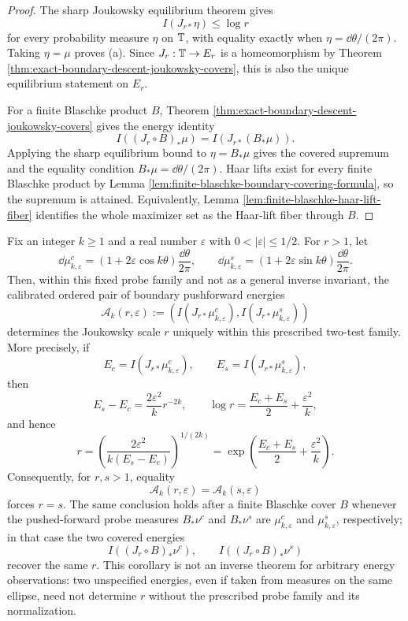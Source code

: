 \begin{proof}
The sharp Joukowsky equilibrium theorem gives
\[
I(J_{r\ast}\eta)\le\log r
\]
for every probability measure \(\eta\) on \(\mathbb{T}\), with equality exactly when \(\eta=\dd\theta/(2\pi)\).  Taking \(\eta=\mu\) proves \textup{(a)}.  Since \(J_r:\mathbb{T}\to E_r\) is a homeomorphism by Theorem \ref{thm:exact-boundary-descent-joukowsky-covers}, this is also the unique equilibrium statement on \(E_r\).

For a finite Blaschke product \(B\), Theorem \ref{thm:exact-boundary-descent-joukowsky-covers} gives the energy identity
\[
I((J_r\circ B)_\ast\mu)=I(J_{r\ast}(B_\ast\mu)).
\]
Applying the sharp equilibrium bound to \(\eta=B_\ast\mu\) gives the covered supremum and the equality condition \(B_\ast\mu=\dd\theta/(2\pi)\).  Haar lifts exist for every finite Blaschke product by Lemma \ref{lem:finite-blaschke-boundary-covering-formula}, so the supremum is attained.
Equivalently, Lemma \ref{lem:finite-blaschke-haar-lift-fiber} identifies the whole maximizer set as the Haar-lift fiber through \(B\).
\end{proof}

\begin{corollary}\label{cor:two-mode-joukowsky-scale-rigidity}
Fix an integer \(k\ge1\) and a real number \(\varepsilon\) with \(0<|\varepsilon|\le1/2\).  For \(r>1\), let
\[
\dd\mu^c_{k,\varepsilon}=(1+2\varepsilon\cos k\theta)\frac{\dd\theta}{2\pi},
\qquad
\dd\mu^s_{k,\varepsilon}=(1+2\varepsilon\sin k\theta)\frac{\dd\theta}{2\pi}.
\]
Then, within this fixed probe family and not as a general inverse invariant, the calibrated ordered pair of boundary pushforward energies
\[
\mathcal A_k(r,\varepsilon):=
\left(
I(J_{r\ast}\mu^c_{k,\varepsilon}),
I(J_{r\ast}\mu^s_{k,\varepsilon})
\right)
\]
determines the Joukowsky scale \(r\) uniquely within this prescribed two-test family.  More precisely, if
\[
E_c=I(J_{r\ast}\mu^c_{k,\varepsilon}),
\qquad
E_s=I(J_{r\ast}\mu^s_{k,\varepsilon}),
\]
then
\[
E_s-E_c=\frac{2\varepsilon^2}{k}r^{-2k},
\qquad
\log r=\frac{E_c+E_s}{2}+\frac{\varepsilon^2}{k},
\]
and hence
\[
\boxed{\;
r=\left(\frac{2\varepsilon^2}{k(E_s-E_c)}\right)^{1/(2k)}
=\exp\!\left(\frac{E_c+E_s}{2}+\frac{\varepsilon^2}{k}\right).
\;}
\]
Consequently, for \(r,s>1\), equality
\[
\mathcal A_k(r,\varepsilon)=\mathcal A_k(s,\varepsilon)
\]
forces \(r=s\).  The same conclusion holds after a finite Blaschke cover \(B\) whenever the pushed-forward probe measures \(B_\ast\nu^c\) and \(B_\ast\nu^s\) are \(\mu^c_{k,\varepsilon}\) and \(\mu^s_{k,\varepsilon}\), respectively; in that case the two covered energies
\[
I((J_r\circ B)_\ast\nu^c),
\qquad
I((J_r\circ B)_\ast\nu^s)
\]
  recover the same \(r\).  This corollary is not an inverse theorem for arbitrary energy observations: two unspecified energies, even if taken from measures on the same ellipse, need not determine \(r\) without the prescribed probe family and its normalization.
\end{corollary}

